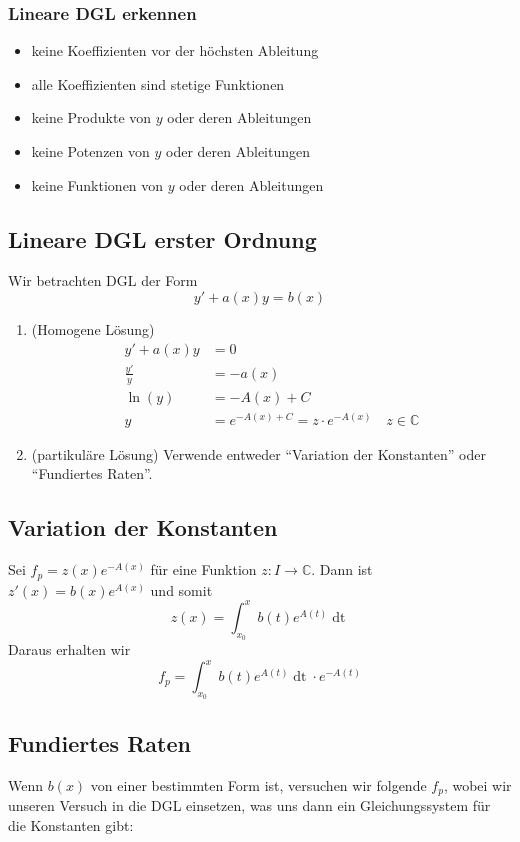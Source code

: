 \documentclass[a4paper,10pt]{article}
\def\C{\mathbb{C}}
\begin{document}
\subsubsection*{Lineare DGL erkennen}
\begin{itemize}
  \item keine Koeffizienten vor der höchsten Ableitung
  \item alle Koeffizienten sind stetige Funktionen
  \item keine Produkte von $y$ oder deren Ableitungen
  \item keine Potenzen von $y$ oder deren Ableitungen
  \item keine Funktionen von $y$ oder deren Ableitungen
\end{itemize}

\subsection{Lineare DGL erster Ordnung}
Wir betrachten DGL der Form \[y' + a(x)y = b(x)\]
\begin{enumerate}
  \item (Homogene Lösung) 
  \begin{align*}
    y' + a(x)y &= 0\\
    \frac{y'}{y} &= -a(x)\\
    \ln(y) &= -A(x)+C\\
    y &= e^{-A(x)+C} = z \cdot e^{-A(x)}\quad z \in \C
  \end{align*}
  \item (partikuläre Lösung) Verwende entweder ``Variation der Konstanten'' oder ``Fundiertes Raten''.
\end{enumerate}
\subsection{Variation der Konstanten}
Sei \(f_p = z(x)e^{-A(x)}\) für eine Funktion \(z: I \to \C\). Dann ist \(z'(x) = b(x) e^{A(x)}\) und somit \[z(x) = \int_{x_0}^x b(t) e^{A(t)} \mathop{dt}\] Daraus erhalten wir \[f_p = \int_{x_0}^x b(t) e^{A(t)} \mathop{dt} \cdot e^{-A(t)}\]

\subsection{Fundiertes Raten}

Wenn $b(x)$ von einer bestimmten Form ist, versuchen wir folgende $f_p$, wobei wir unseren Versuch in die DGL einsetzen, was uns dann ein Gleichungssystem für die Konstanten gibt:
\end{document}
